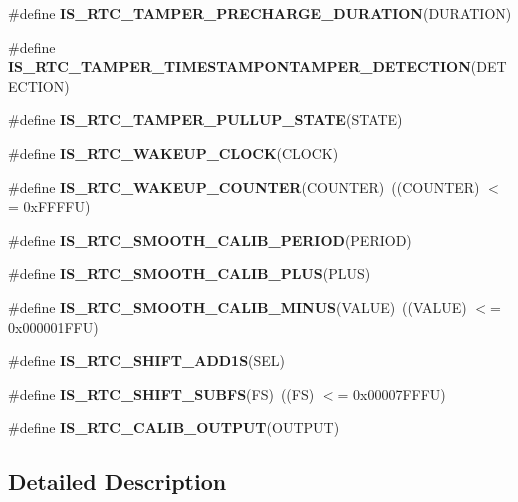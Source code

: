\begin{DoxyCompactItemize}
\item 
\#define {\bfseries I\+S\+\_\+\+R\+T\+C\+\_\+\+T\+A\+M\+P\+E\+R\+\_\+\+P\+R\+E\+C\+H\+A\+R\+G\+E\+\_\+\+D\+U\+R\+A\+T\+I\+ON}(D\+U\+R\+A\+T\+I\+ON)
\item 
\#define {\bfseries I\+S\+\_\+\+R\+T\+C\+\_\+\+T\+A\+M\+P\+E\+R\+\_\+\+T\+I\+M\+E\+S\+T\+A\+M\+P\+O\+N\+T\+A\+M\+P\+E\+R\+\_\+\+D\+E\+T\+E\+C\+T\+I\+ON}(D\+E\+T\+E\+C\+T\+I\+ON)
\item 
\#define {\bfseries I\+S\+\_\+\+R\+T\+C\+\_\+\+T\+A\+M\+P\+E\+R\+\_\+\+P\+U\+L\+L\+U\+P\+\_\+\+S\+T\+A\+TE}(S\+T\+A\+TE)
\item 
\#define {\bfseries I\+S\+\_\+\+R\+T\+C\+\_\+\+W\+A\+K\+E\+U\+P\+\_\+\+C\+L\+O\+CK}(C\+L\+O\+CK)
\item 
\mbox{\label{group___r_t_c_ex___i_s___r_t_c___definitions_ga6254b48843bdcb83b5b5cd640aeb6f9c}} 
\#define {\bfseries I\+S\+\_\+\+R\+T\+C\+\_\+\+W\+A\+K\+E\+U\+P\+\_\+\+C\+O\+U\+N\+T\+ER}(C\+O\+U\+N\+T\+ER)~((C\+O\+U\+N\+T\+ER) $<$= 0x\+F\+F\+F\+F\+U)
\item 
\#define {\bfseries I\+S\+\_\+\+R\+T\+C\+\_\+\+S\+M\+O\+O\+T\+H\+\_\+\+C\+A\+L\+I\+B\+\_\+\+P\+E\+R\+I\+OD}(P\+E\+R\+I\+OD)
\item 
\#define {\bfseries I\+S\+\_\+\+R\+T\+C\+\_\+\+S\+M\+O\+O\+T\+H\+\_\+\+C\+A\+L\+I\+B\+\_\+\+P\+L\+US}(P\+L\+US)
\item 
\mbox{\label{group___r_t_c_ex___i_s___r_t_c___definitions_ga257f8bd6835bee480a80416bf086e200}} 
\#define {\bfseries I\+S\+\_\+\+R\+T\+C\+\_\+\+S\+M\+O\+O\+T\+H\+\_\+\+C\+A\+L\+I\+B\+\_\+\+M\+I\+N\+US}(V\+A\+L\+UE)~((V\+A\+L\+UE) $<$= 0x000001\+F\+F\+U)
\item 
\#define {\bfseries I\+S\+\_\+\+R\+T\+C\+\_\+\+S\+H\+I\+F\+T\+\_\+\+A\+D\+D1S}(S\+EL)
\item 
\mbox{\label{group___r_t_c_ex___i_s___r_t_c___definitions_ga8ad118d512f7dc9ce3d4b6669fd3f4b4}} 
\#define {\bfseries I\+S\+\_\+\+R\+T\+C\+\_\+\+S\+H\+I\+F\+T\+\_\+\+S\+U\+B\+FS}(FS)~((FS) $<$= 0x00007\+F\+F\+F\+U)
\item 
\#define {\bfseries I\+S\+\_\+\+R\+T\+C\+\_\+\+C\+A\+L\+I\+B\+\_\+\+O\+U\+T\+P\+UT}(O\+U\+T\+P\+UT)
\end{DoxyCompactItemize}


\subsection{Detailed Description}



